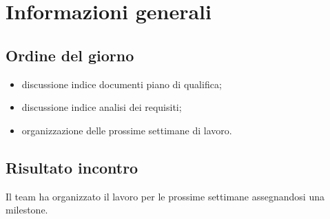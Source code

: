 \section{Informazioni generali}
    \def\modifiche { 
        {Data, 2020-12-16},
        {Ora inizio, 16:10},
        {Ora fine, 17:45},
        {Luogo, Discord},
        {Presenze, \unexpanded{
            \begin{itemize}
                \item Andrea Breggion;
                \item Matteo Falsetti;
                \item Alessandro Flori;
                \item Diego Piola;
                \item Andrea Signori;
                \item Damiano Zanardo.
            \end{itemize}}
        },
    }
    

\subsection{Ordine del giorno}
\begin{itemize}
    \item discussione indice documenti piano di qualifica;
    \item discussione indice analisi dei requisiti;
    \item organizzazione delle prossime settimane di lavoro.
\end{itemize}

\subsection{Risultato incontro}
    Il team ha organizzato il lavoro per le prossime settimane assegnandosi una
	milestone.   